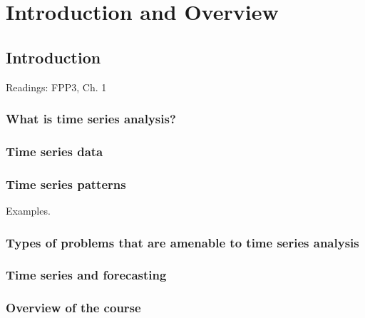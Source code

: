 \documentclass[
]{book}
\begin{document}
\hypertarget{part-introduction-and-overview}{%
\part{Introduction and Overview}\label{part-introduction-and-overview}}

\hypertarget{intro}{%
\chapter{Introduction}\label{intro}}

Readings: FPP3, Ch. 1

\hypertarget{what-is-time-series-analysis}{%
\section{What is time series analysis?}\label{what-is-time-series-analysis}}

\hypertarget{time-series-data}{%
\section{Time series data}\label{time-series-data}}

\hypertarget{time-series-patterns}{%
\section{Time series patterns}\label{time-series-patterns}}

Examples.

\hypertarget{types-of-problems-that-are-amenable-to-time-series-analysis}{%
\section{Types of problems that are amenable to time series analysis}\label{types-of-problems-that-are-amenable-to-time-series-analysis}}

\hypertarget{time-series-and-forecasting}{%
\section{Time series and forecasting}\label{time-series-and-forecasting}}

\hypertarget{overview-of-the-course}{%
\section{Overview of the course}\label{overview-of-the-course}}
\end{document}
